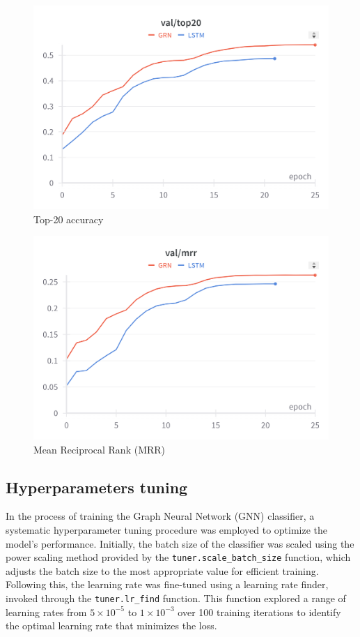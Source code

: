 \documentclass[twocolumn,twoside]{article}
\begin{document}
\begin{figure}[ht]
  \centering
  \includegraphics[width=\linewidth]{top20.png}
  \caption{Top-20 accuracy}
  \label{fig:top20}
\end{figure}
\begin{figure}[ht]
  \centering
  \includegraphics[width=\linewidth]{mrr.png}
  \caption{Mean Reciprocal Rank (MRR)}
  \label{fig:mrr}
\end{figure}


\subsection{Hyperparameters tuning}
In the process of training the Graph Neural Network (GNN) classifier,
 a systematic hyperparameter tuning procedure was employed 
 to optimize the model's performance. Initially,
  the batch size of the classifier was scaled using the power 
  scaling method provided by the \texttt{tuner.scale\_batch\_size} function, 
  which adjusts the batch size to the most appropriate value 
  for efficient training. Following this, the learning rate was
   fine-tuned using a learning rate finder, invoked through the 
   \texttt{tuner.lr\_find} function. This function explored a
    range of learning rates from $5 \times 10^{-5}$ to $1 \times 10^{-3}$ over
     100 training iterations to identify the optimal learning rate
      that minimizes the loss.
\end{document}
